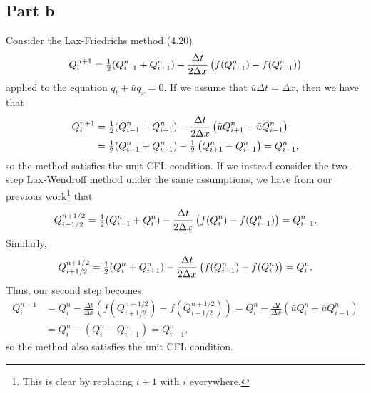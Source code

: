 \documentclass{article}
\begin{document}
\subsection{Part b}
Consider the Lax-Friedrichs method (4.20)
\[
Q^{n+1}_i=\mbox{$\frac{1}{2}$}(Q^n_{i-1}+Q^n_{i+1})-\frac{\Delta t}{2\Delta x}\left(f(Q^n_{i+1})-f(Q^n_{i-1})\right)
\]
applied to the equation $q_t+\bar{u}q_x=0$. If we assume that $\bar{u}\Delta t=\Delta x$, then we have that 
\begin{align*}
Q^{n+1}_i&=\mbox{$\frac{1}{2}$}(Q^n_{i-1}+Q^n_{i+1})-\frac{\Delta t}{2\Delta x}\left(\bar uQ^n_{i+1}-\bar uQ^n_{i-1}\right)\\&=
\mbox{$\frac{1}{2}$}(Q^n_{i-1}+Q^n_{i+1})-\mbox{$\frac{1}{2}$}\left(Q^n_{i+1}-Q^n_{i-1}\right)=Q^n_{i-1},
\end{align*}
so the method satisfies the unit CFL condition. If we instead consider the two-step Lax-Wendroff method under the same assumptions, we have from our previous work\footnote{This is clear by replacing $i+1$ with $i$ everywhere.} that 
\[
Q^{n+1/2}_{i-1/2}=\mbox{$\frac{1}{2}$}(Q^n_{i-1}+Q^n_{i})-\frac{\Delta t}{2\Delta x}\left(f(Q^n_{i})-f(Q^n_{i-1})\right)=Q^n_{i-1}.
\]
Similarly, 
\[
Q^{n+1/2}_{i+1/2}=\mbox{$\frac{1}{2}$}(Q^n_{i}+Q^n_{i+1})-\frac{\Delta t}{2\Delta x}\left(f(Q^n_{i+1})-f(Q^n_{i})\right)=Q^n_{i}.
\]
Thus, our second step becomes
\begin{align*}
Q^{n+1}_i&=Q^n_i-\frac{\Delta t}{\Delta x}\left(f\left(Q^{n+1/2}_{i+1/2}\right)-f\left(Q^{n+1/2}_{i-1/2}\right)\right)=Q^n_i-\frac{\Delta t}{\Delta x}\left(\bar uQ^n_i-\bar uQ^n_{i-1}\right)\\&=
Q^n_i-\left(Q^n_i-Q^n_{i-1}\right)=Q^n_{i-1},
\end{align*}
so the method also satisfies the unit CFL condition.
\end{document}

